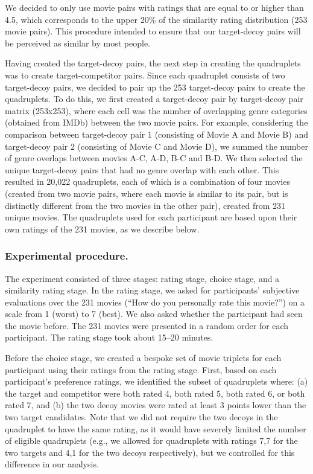 \documentclass[12pt, a4paper]{article}
\begin{document}
We decided to only use movie pairs with ratings that are equal to or higher than 4.5, which corresponds to the upper 20\% of the similarity rating distribution (253 movie pairs). This procedure intended to ensure that our target-decoy pairs will be perceived as similar by most people.

Having created the target-decoy pairs, the next step in creating the quadruplets was to create target-competitor pairs. Since each quadruplet consists of two target-decoy pairs, we decided to pair up the 253 target-decoy pairs to create the quadruplets. To do this, we first created a target-decoy pair by target-decoy pair matrix (253x253), where each cell was the number of overlapping genre categories (obtained from IMDb) between the two movie pairs. For example, considering the comparison between target-decoy pair 1 (consisting of Movie A and Movie B) and target-decoy pair 2 (consisting of Movie C and Movie D), we summed the number of genre overlaps between movies A-C, A-D, B-C and B-D. We then selected the unique target-decoy pairs that had no genre overlap with each other. This resulted in 20,022 quadruplets, each of which is a combination of four movies (created from two movie pairs, where each movie is similar to its pair, but is distinctly different from the two movies in the other pair), created from 231 unique movies. The quadruplets used for each participant are based upon their own ratings of the 231 movies, as we describe below.

\subsubsection*{Experimental procedure.}

The experiment consisted of three stages: rating stage, choice stage, and a similarity rating stage. In the rating stage, we asked for participants' subjective evaluations over the 231 movies (``How do you personally rate this movie?'') on a scale from 1 (worst) to 7 (best). We also asked whether the participant had seen the movie before. The 231 movies were presented in a random order for each participant. The rating stage took about 15--20 minutes.

Before the choice stage, we created a bespoke set of movie triplets for each participant using their ratings from the rating stage. First, based on each participant's preference ratings, we identified the subset of quadruplets where: (a) the target and competitor were both rated 4, both rated 5, both rated 6, or both rated 7, and (b) the two decoy movies were rated at least 3 points lower than the two target candidates. Note that we did not require the two decoys in the quadruplet to have the same rating, as it would have severely limited the number of eligible quadruplets (e.g., we allowed for quadruplets with ratings 7,7 for the two targets and 4,1 for the two decoys respectively), but we controlled for this difference in our analysis.
\end{document}
